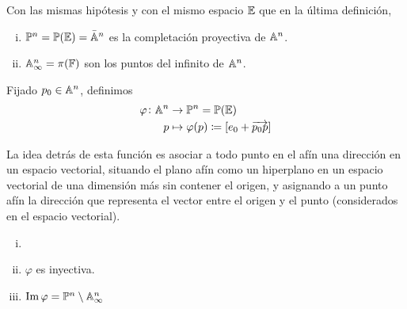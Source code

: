 \begin{defi}
  Con las mismas hipótesis y con el mismo espacio $\mathbb{E}$ que en la última definición,
  \begin{enumerate}[i)]
    \item $\mathbb{P}^n = \mathbb{P} (\mathbb{E}) = \bar{\mathbb{A}}^n$ es la completación proyectiva
    de $\mathbb{A}^n$.
    \item $\mathbb{A}^n_\infty = \pi(\mathbb{F})$ son los puntos del infinito de $\mathbb{A}^n$.
  \end{enumerate}
\end{defi}

\begin{defi}
  Fijado $p_0 \in \mathbb{A}^n$, definimos
   \[
     \begin{aligned}
       \varphi \colon \mathbb{A}^n &\to \mathbb{P}^n = \mathbb{P}(\mathbb{E})\\
       p &\mapsto \varphi(p) \coloneqq [e_0 + \overrightarrow{p_0p}]
     \end{aligned}
   \]
\end{defi}

\begin{obs}
  La idea detrás de esta función es asociar a todo punto en el afín una dirección
  en un espacio vectorial, situando el plano afín como un hiperplano 
  en un espacio vectorial de una dimensión más sin contener el origen, 
  y asignando a un punto afín la dirección que representa el vector entre el origen
  y el punto (considerados en el espacio vectorial).
\end{obs}

\begin{prop}
  \begin{enumerate}[i)]
    \item[]
    \item $\varphi$ es inyectiva.
    \item $\operatorname{Im} \varphi = \mathbb{P}^n \setminus \mathbb{A}^n_\infty$
  \end{enumerate}
\end{prop}

